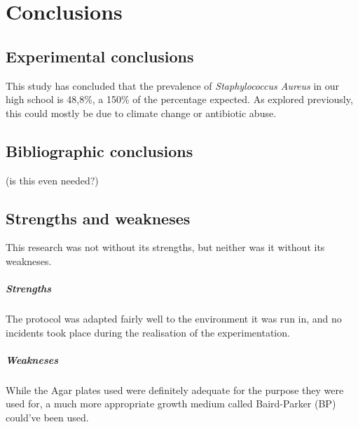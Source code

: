 \chapter{Conclusions}
\section{Experimental conclusions}
This study has concluded that the prevalence of \emph{Staphylococcus Aureus} in our high school is 48,8\%, a 150\% of the percentage expected. As explored previously, this could mostly be due to climate change or antibiotic abuse.
\section{Bibliographic conclusions}
(is this even needed?)
\section{Strengths and weakneses}
This research was not without its strengths, but neither was it without its weakneses.
\paragraph{Strengths} The protocol was adapted fairly well to the environment it was run in, and no incidents took place during the realisation of the experimentation.
\paragraph{Weakneses} While the Agar plates used were definitely adequate for the purpose they were used for, a much more appropriate growth medium called Baird-Parker (BP) could've been used.
